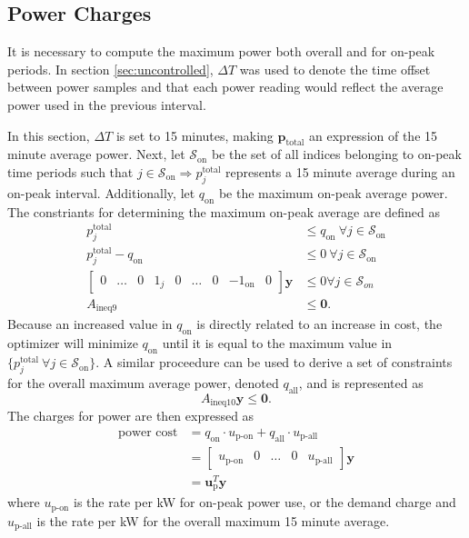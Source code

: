 \subsection{Power Charges}
It is necessary to compute the maximum power both overall and for on-peak periods. In section \ref{sec:uncontrolled}, $\Delta T$ was used to denote the time offset between power samples and that each power reading would reflect the average power used in the previous interval. 
\par In this section, $\Delta T$ is set to 15 minutes, making $\mathbf{p}_{\text{total}}$ an expression of the 15 minute average power. Next, let $\mathcal{S}_{\text{on}}$ be the set of all indices belonging to on-peak time periods such that $j\in \mathcal{S}_{\text{on}} \Rightarrow p_j^{\text{total}} $ represents a 15 minute average during an on-peak interval.  Additionally, let $q_{\text{on}}$ be the maximum on-peak average power.  The constriants for determining the maximum on-peak average are defined as
\begin{equation} \begin{aligned}
	p_j^{\text{total}} &\le q_{\text{on}} \ \forall j \in \mathcal{S}_{\text{on}} \\
	p_j^{\text{total}} - q_{\text{on}} &\le 0 \ \forall j \in \mathcal{S}_{\text{on}}\\
	\begin{bmatrix}0 & \hdots & 0 & 1_j & 0 & \hdots & 0 & -1_{\text{on}} & 0 \end{bmatrix}\mathbf{y} &\le 0 \forall j\in \mathcal{S}_{on} \\
		A_{\text{ineq9}} &\le \mathbf{0}.
\end{aligned} \end{equation}
Because an increased value in $q_{\text{on}}$ is directly related to an increase in cost, the optimizer will minimize $q_{\text{on}}$ until it is equal to the maximum value in $\{p_j^{\text{total}} \ \forall j \in \mathcal{S}_{\text{on}}\}$. A similar proceedure can be used to derive a set of constraints for the overall maximum average power, denoted $q_{\text{all}}$, and is represented as
\begin{equation} 
	A_{\text{ineq10}}\mathbf{y} \le  \mathbf{0}.
\end{equation}
The charges for power are then expressed as 
\begin{equation} \begin{aligned}
	\text{power cost} &= q_{\text{on}}\cdot u_{\text{p-on}} + q_{\text{all}} \cdot u_{\text{p-all}} \\
	                  &= \begin{bmatrix}u_{\text{p-on}} & 0 & \hdots & 0 & u_{\text{p-all}} \end{bmatrix}\mathbf{y} \\
		          &= \mathbf{u}_{\text{p}}^T\mathbf{y}
\end{aligned}\end{equation}
where $u_{\text{p-on}}$ is the rate per kW for on-peak power use, or the demand charge and $u_{\text{p-all}}$ is the rate per kW for the overall maximum 15 minute average.
